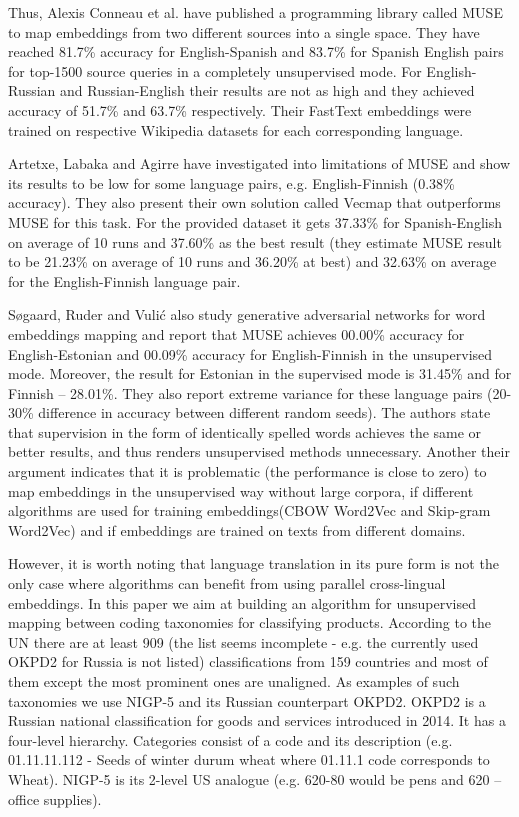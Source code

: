 \documentclass[conference]{IEEEtran}
\begin{document}
Thus, Alexis Conneau et al. \cite{muse} have published a programming library called MUSE to map embeddings from two different sources into a single space. They have reached 81.7\% accuracy for English-Spanish and 83.7\% for Spanish English pairs for top-1500 source queries in a completely unsupervised mode. For English-Russian and Russian-English their results are not as high and they achieved accuracy of 51.7\% and 63.7\% respectively. Their FastText embeddings were trained on respective Wikipedia datasets for each corresponding language. 

Artetxe, Labaka and Agirre have investigated into limitations of MUSE and show its results to be low for some language pairs, e.g. English-Finnish (0.38\% accuracy). They also present their own solution called Vecmap \cite{vecmap} that outperforms MUSE for this task. For the provided dataset it gets 37.33\% for Spanish-English on average of 10 runs and 37.60\% as the best result (they estimate MUSE result to be 21.23\% on average of 10 runs and 36.20\% at best) and 32.63\% on average for the English-Finnish language pair.

Søgaard, Ruder and Vulić \cite{ruder-muse-limitations} also study generative adversarial networks for word embeddings mapping and report that MUSE achieves 00.00\% accuracy for English-Estonian and 00.09\% accuracy for English-Finnish in the unsupervised mode. Moreover, the result for Estonian in the supervised mode is 31.45\% and for Finnish -- 28.01\%. They also report extreme variance for these language pairs (20-30\% difference in accuracy between different random seeds). The authors state that supervision in the form of identically spelled words achieves the same or better results, and thus renders unsupervised methods unnecessary. Another their argument indicates that it is problematic (the performance is close to zero) to map embeddings in the unsupervised way without large corpora, if different algorithms are used for training embeddings(CBOW Word2Vec and Skip-gram Word2Vec) and if embeddings are trained on texts from different domains.

However, it is worth noting that language translation in its pure form is not the only case where algorithms can benefit from using parallel cross-lingual embeddings. In this paper we aim at building an algorithm for unsupervised mapping between coding taxonomies for classifying products. According to the UN \cite{unsd} there are at least 909 (the list seems incomplete - e.g. the currently used OKPD2 for Russia is not listed) classifications from 159 countries and most of them except the most prominent ones are unaligned. As examples of such taxonomies we use NIGP-5 and its Russian counterpart OKPD2. OKPD2 is a Russian national classification for goods and services introduced in 2014. It has a four-level hierarchy. Categories consist of a code and its description (e.g. 01.11.11.112 - Seeds of winter durum wheat where 01.11.1 code corresponds to Wheat). NIGP-5 is its 2-level US analogue (e.g. 620-80 would be pens and 620 -- office supplies).
\end{document}
